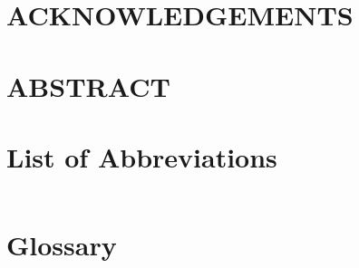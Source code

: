 \documentclass[12pt,a4paper]{report}
\begin{document}
\chapter*{ACKNOWLEDGEMENTS}

\chapter*{ABSTRACT}

\tableofcontents
\listoffigures
\listoftables

\chapter*{List of Abbreviations}
\begin{tabular}{@{}ll@{}}
\end{tabular}

\chapter*{Glossary}
\begin{description}
\end{description}



\end{document}
